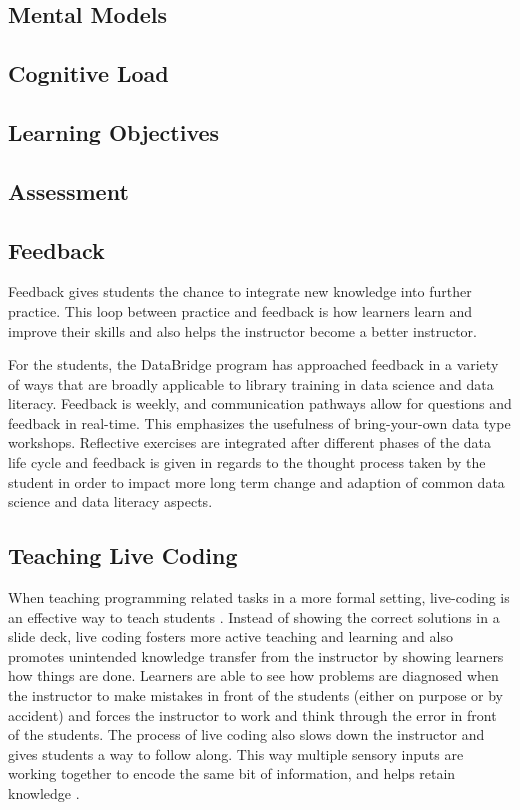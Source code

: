 \documentclass[../main.tex]{subfiles}
\begin{document}
        \subsection{Mental Models}
        
        \subsection{Cognitive Load}
        
        \subsection{Learning Objectives}
        
        \subsection{Assessment}
        
        \subsection{Feedback}
        
        Feedback gives students the chance to integrate new knowledge into further practice.
        This loop between practice and feedback is how learners learn and improve their skills and also helps the instructor become a better instructor.
        
For the students, the DataBridge program has approached feedback in a variety of ways that are broadly applicable to library training in data science and data literacy. Feedback is weekly, and communication pathways allow for questions and feedback in real-time. This emphasizes the usefulness of bring-your-own data type workshops. Reflective exercises are integrated after different phases of the data life cycle and feedback is given in regards to the thought process taken by the student in order to impact more long term change and adaption of common data science and data literacy aspects.

        \subsection{Teaching Live Coding}
        
        When teaching programming related tasks in a more formal setting, live-coding is an effective way to teach students . Instead of showing the correct solutions in a slide deck, live coding fosters more active teaching and learning and also promotes unintended knowledge transfer from the instructor by showing learners how things are done. Learners are able to see how problems are diagnosed when the instructor to make mistakes in front of the students (either on purpose or by accident) and forces the instructor to work and think through the error in front of the students. The process of live coding also slows down the instructor and gives students a way to follow along. This way multiple sensory inputs are working together to encode the same bit of information, and helps retain knowledge .
        
\end{document}
